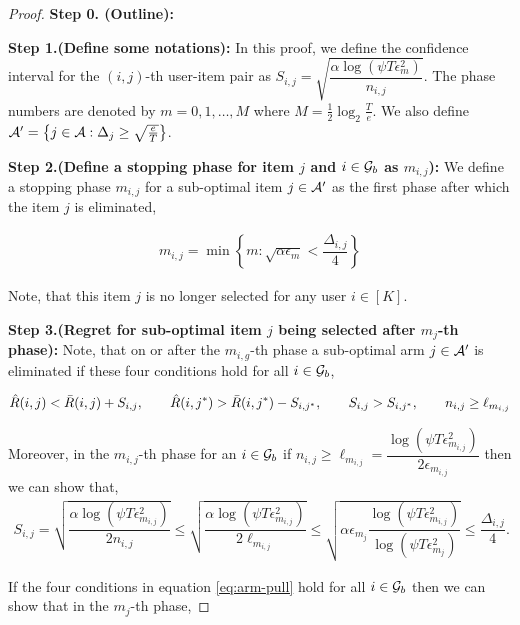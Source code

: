 \begin{proof}

\textbf{Step 0. (Outline):} 

\textbf{Step 1.(Define some notations):} In this proof,  we define the confidence interval for the $(i,j)$-th user-item pair as $S_{i,j}=\sqrt{\dfrac{\alpha\log(\psi T\epsilon_m^2)}{n_{i,j}}}$. The phase numbers are denoted by $m=0,1,\ldots,M$ where $M=\frac{1}{2}\log_{2}\frac{T}{e}$. We also define $\mathcal{A}'=\big\lbrace j\in\mathcal{A}: \Delta_{j}\geq \sqrt{\frac{e}{T}} \big\rbrace$.

\textbf{Step 2.(Define a stopping phase for item $j$ and $i\in\mathcal{G}_b$ as  $m_{i,j}$):} We define a stopping phase $m_{i,j}$ for a sub-optimal item $j\in\mathcal{A}'$ as the first phase after which the item $j$ is eliminated,

\begin{align*}
m_{i,j} = \min\left\lbrace m: \sqrt{\alpha\epsilon_{m}} < \dfrac{\Delta_{i,j}}{4} \right\rbrace
\end{align*} 

Note, that this item $j$ is no longer selected for any user $i\in[K]$.

\textbf{Step 3.(Regret for sub-optimal item $j$ being selected after $m_{j}$-th phase):} Note, that on or after the $m_{i,g}$-th phase a sub-optimal arm $j\in\mathcal{A}'$ is eliminated if these four conditions hold for all $i\in\mathcal{G}_b$,

\begin{eqnarray}
\hat{R}(i,j) < \bar{R}(i,j) + S_{i,j}, \hspace*{2em}  \hat{R}(i,j^*) > \bar{R}(i,j^*) - S_{i,j^*}, \hspace*{2em} S_{i,j} > S_{i,j^*}, \hspace*{2em} n_{i,j} \geq \ell_{m_{i,j}} \label{eq:arm-pull}
\end{eqnarray}

Moreover, in the $m_{i,j}$-th phase for an $i\in\mathcal{G}_b$ if $n_{i,j} \geq \ell_{m_{i,j}} = \dfrac{\log(\psi T\epsilon_{m_{i,j}}^2)}{2\epsilon_{m_{i,j}}}$ then we can show that,
\begin{align*}
S_{i,j} = \sqrt{\dfrac{\alpha\log(\psi T\epsilon_{m_{i,j}}^2)}{2n_{i,j}}} \leq \sqrt{\dfrac{\alpha\log(\psi T\epsilon_{m_{i,j}}^2)}{2\ell_{m_{i,j}}}} \leq \sqrt{\alpha\epsilon_{m_{j}}\dfrac{\log(\psi T\epsilon_{m_{i,j}}^2)}{\log(\psi T\epsilon_{m_{j}}^2)}} \leq \dfrac{\Delta_{i,j}}{4}.
\end{align*}

If the four conditions in equation \ref{eq:arm-pull} hold for all $i\in\mathcal{G}_b$ then we can show that in the $m_{j}$-th phase,


\end{proof}
